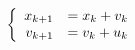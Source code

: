 \documentclass{article}
\begin{document}
\thispagestyle{empty}

$$
\left \{ \begin{array}{r l}
x_{k+1} & = x_k + v_k\\
v_{k+1} & = v_k + u_k
\end{array} \right.
$$
\end{document}
